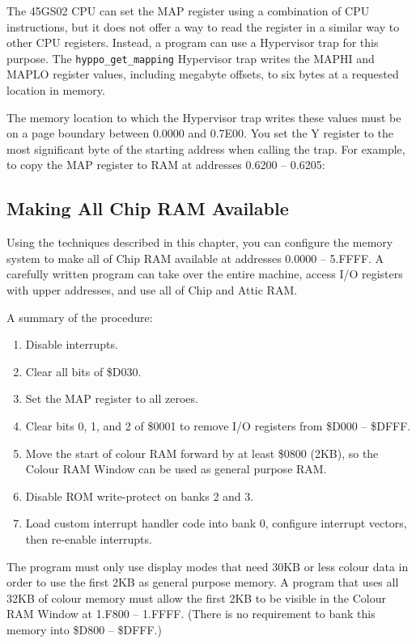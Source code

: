 The 45GS02 CPU can set the MAP register using a combination of CPU instructions, but it does not offer a way to read the register in a similar way to other CPU registers. Instead, a program can use a Hypervisor trap for this purpose. The {\tt hyppo\_get\_mapping} Hypervisor trap writes the MAPHI and MAPLO register values, including megabyte offsets, to six bytes at a requested location in memory.

The memory location to which the Hypervisor trap writes these values must be on a page boundary between 0.0000 and 0.7E00. You set the Y register to the most significant byte of the starting address when calling the trap. For example, to copy the MAP register to RAM at addresses 0.6200 -- 0.6205:


\subsection{Making All Chip RAM Available}

Using the techniques described in this chapter, you can configure the memory system to make all of Chip RAM available at addresses 0.0000 -- 5.FFFF. A carefully written program can take over the entire machine, access I/O registers with upper addresses, and use all of Chip and Attic RAM.

A summary of the procedure:

\begin{enumerate}
\item Disable interrupts.
\item Clear all bits of \$D030.
\item Set the MAP register to all zeroes.
\item Clear bits 0, 1, and 2 of \$0001 to remove I/O registers from \$D000 -- \$DFFF.
\item Move the start of colour RAM forward by at least \$0800 (2KB), so the Colour RAM Window can be used as general purpose RAM.
\item Disable ROM write-protect on banks 2 and 3.
\item Load custom interrupt handler code into bank 0, configure interrupt vectors, then re-enable interrupts.
\end{enumerate}

The program must only use display modes that need 30KB or less colour data in order to use the first 2KB as general purpose memory. A program that uses all 32KB of colour memory must allow the first 2KB to be visible in the Colour RAM Window at 1.F800 -- 1.FFFF. (There is no requirement to bank this memory into \$D800 -- \$DFFF.)

